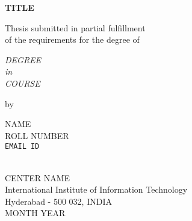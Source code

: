 \thispagestyle{empty}
\begin{center}
\vspace*{1.5cm}
{\Large \bf TITLE}

\vspace*{3.75cm}
{\large Thesis submitted in partial fulfillment\\}
{\large  of the requirements for the degree of \\}

\vspace*{1cm}
{\it {\large DEGREE} \\
{\large in\\}
{\large COURSE \\}}

\vspace*{1cm}
{\large by}

\vspace*{5mm}
{\large NAME\\}
{\large ROLL NUMBER\\
{\small \tt EMAIL ID}}


\vspace*{4.0cm}
{\\}
{\large CENTER NAME \\}
{\large International Institute of Information Technology\\}
{\large Hyderabad - 500 032, INDIA\\}
{\large MONTH YEAR\\}
\end{center}